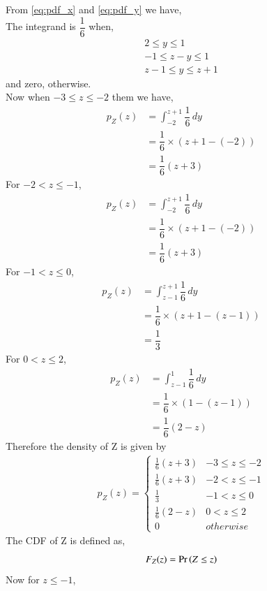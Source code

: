 From \ref{eq:pdf_x} and \ref{eq:pdf_y} we have, \\
The integrand is $\dfrac{1}{6}$ when,
\begin{align}
    2 \le y \le 1 \\
    -1 \le z-y \le 1 \\
    z-1 \le y \le z+1
\end{align}
and zero, otherwise. \\
Now when $-3 \le z \le -2$ them we have, 
\begin{align}
    p_Z(z) &=   \int_{-2}^{z+1} \dfrac{1}{6} \,dy  \\
          &= \dfrac{1}{6} \times ( z+1 - (-2)) \\
          &= \dfrac{1}{6}(z+3)
\end{align}
For $ -2 < z \le -1 $,
\begin{align}
    p_Z(z) &=   \int_{-2}^{z+1} \dfrac{1}{6} \,dy  \\
          &= \dfrac{1}{6} \times ( z+1 - (-2)) \\
          &= \dfrac{1}{6}(z+3)
\end{align}
For $ -1 < z \le 0 $,
\begin{align}
    p_Z(z) &=   \int_{z-1}^{z+1} \dfrac{1}{6} \,dy  \\
          &= \dfrac{1}{6} \times ( z+1 - (z-1)) \\
          &= \dfrac{1}{3}
\end{align}
For $ 0 < z \le 2$,
\begin{align}
    p_Z(z) &=   \int_{z-1}^{1} \dfrac{1}{6} \,dy  \\
          &= \dfrac{1}{6} \times ( 1- (z-1)) \\
          &= \dfrac{1}{6}(2-z)
\end{align}
Therefore the density of Z is given by
\begin{align}
\label{eq:pdf_z}
p_{Z}(z)  = 
\begin{cases}
\frac{1}{6}(z+3) & -3 \le z \le -2
\\
\frac{1}{6}(z+3) & -2 < z \le -1
\\
\frac{1}{3} & -1 < z \le 0
\\
\frac{1}{6}(2-z) & 0 < z \le 2
\\
0 & otherwise
\end{cases}
\end{align}
The CDF of Z is defined as,
\begin{equation}
    F_Z(z) = \Pr\left(Z \le z\right)
\end{equation}
Now for $ z \le -1 $,
